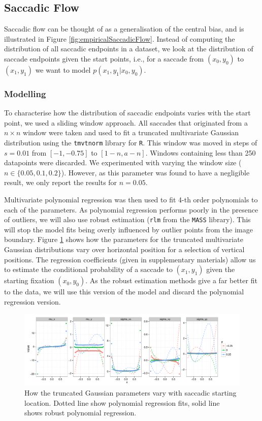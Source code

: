 \documentclass[a4paper, twocolumn, oneside, 11pt]{article}
\begin{document}
\subsection{Saccadic Flow}
\label{ModellingFlow}

Saccadic flow can be thought of as a generalisation of the central bias, and is illustrated in Figure \ref{fig:empiricalSaccadicFlow}. Instead of computing the distribution of all saccadic endpoints in a dataset, we look at the distribution of saccade endpoints given the start points, i.e., for a saccade from $(x_0, y_0)$ to $(x_1, y_1)$ we want to model $p(x_1,y_1|x_0, y_0)$.

\subsubsection{Modelling}

To characterise how the distribution of saccadic endpoints varies with the start point, we used a sliding window approach. All saccades that originated from a $n\times n$ window were taken and used to fit a truncated multivariate Gaussian distribution using the \texttt{tmvtnorm} library for \texttt{R}. This window was moved in steps of $s=0.01$ from $[-1,-0.75]$ to $[1-n, a-n]$. Windows containing less than 250 datapoints were discarded. We experimented with varying the window size ($n\in\{0.05,0.1, 0.2\}$). However, as this parameter was found to have a negligible result, we only report the results for $n=0.05$.

Multivariate polynomial regression was then used to fit 4-th order polynomials to each of the parameters. As polynomial regression performs poorly in the presence of outliers, we will also use robust estimation (\texttt{rlm} from the \texttt{MASS} library). This will stop the model fits being overly influenced by outlier points from the image boundary. Figure \ref{fig:nParamsOverSpace} shows how the parameters for the truncated multivariate Gaussian distributions vary over horizontal position for a selection of vertical positions. The regression coefficients (given in supplementary materials) allow us to estimate the conditional probability of a saccade to $(x_1, y_1)$ given the starting fixation $(x_0, y_0)$. As the robust estimation methods give a far better fit to the data, we will use this version of the model and discard the polynomial regression version.

\begin{figure}[ht]
\centering
\includegraphics[width=13cm]{../scripts/flow/figs/NparamsChagingOverSpace_ALL_tN}
\caption{How the truncated Gaussian parameters vary with saccadic starting location. Dotted line show polynomial regression fits, solid line shows robust polynomial regression.}
\label{fig:nParamsOverSpace}
\end{figure}
\end{document}
